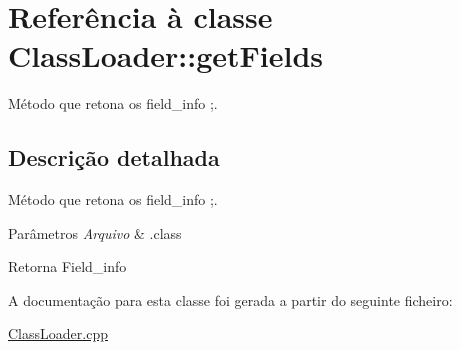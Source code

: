 \hypertarget{class_class_loader_1_1get_fields}{}\section{Referência à classe Class\+Loader\+:\+:get\+Fields}
\label{class_class_loader_1_1get_fields}


Método que retona os field\+\_\+info ;.  




\subsection{Descrição detalhada}
Método que retona os field\+\_\+info ;. 


\begin{DoxyParams}{Parâmetros}
{\em Arquivo} & .class \\
\hline
\end{DoxyParams}
\begin{DoxyReturn}{Retorna}
Field\+\_\+info 
\end{DoxyReturn}


A documentação para esta classe foi gerada a partir do seguinte ficheiro\+:\begin{DoxyCompactItemize}
\item 
\hyperlink{_class_loader_8cpp}{Class\+Loader.\+cpp}\end{DoxyCompactItemize}
